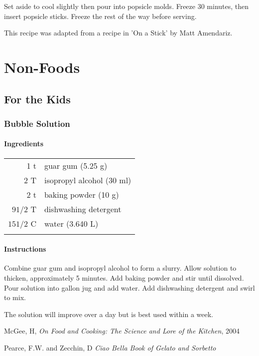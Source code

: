 \documentclass[12pt,landscape,twoside,twocolumn, openright, titlepage, draft]{book}
\begin{document}
Set aside to cool slightly then pour into popsicle molds. Freeze 30 minutes, then insert popsicle sticks. Freeze the rest of the way before serving.

This recipe was adapted from a recipe in 'On a Stick' by Matt Amendariz.

\chapter{Non-Foods}
\section{For the Kids}
\subsection{Bubble Solution}
\subsubsection{Ingredients}
\begin{tabular}{r p{1.5in}}
  1 t        & guar gum (5.25 g) \\
  2 T        & isopropyl alcohol (30 ml) \\
  2 t        & baking powder (10 g) \\
  $9 1/2$ T  & dishwashing detergent \\
  $15 1/2$ C & water (3.640 L) \\ \\
\end{tabular}

\subsubsection{Instructions}
Combine guar gum and isopropyl alcohol to form a slurry. Allow solution to thicken, approximately 5 minutes. Add baking powder and stir until dissolved. Pour solution into gallon jug and add water. Add dishwashing detergent and swirl to mix.

The solution will improve over a day but is best used within a week.

\begin{thebibliography}{99}

 McGee, H, {\it On Food and Cooking: The Science and Lore of the Kitchen}, 2004

 Pearce, F.W. and Zecchin, D {\it Ciao Bella Book of Gelato and Sorbetto}
\end{thebibliography}
\end{document}
